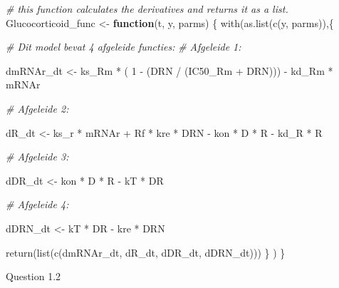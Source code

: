 \documentclass[
]{article}
\newenvironment{Shaded}{\begin{snugshade}}{\end{snugshade}}
\newcommand{\CommentTok}[1]{\textcolor[rgb]{0.56,0.35,0.01}{\textit{#1}}}
\newcommand{\ControlFlowTok}[1]{\textcolor[rgb]{0.13,0.29,0.53}{\textbf{#1}}}
\newcommand{\DecValTok}[1]{\textcolor[rgb]{0.00,0.00,0.81}{#1}}
\newcommand{\FunctionTok}[1]{\textcolor[rgb]{0.00,0.00,0.00}{#1}}
\newcommand{\NormalTok}[1]{#1}
\newcommand{\OtherTok}[1]{\textcolor[rgb]{0.56,0.35,0.01}{#1}}
\newcommand{\SpecialCharTok}[1]{\textcolor[rgb]{0.00,0.00,0.00}{#1}}
\begin{document}
\begin{Shaded}
\begin{Highlighting}[]
\CommentTok{\# this function calculates the derivatives and returns it as a list.}
\NormalTok{Glucocorticoid\_func }\OtherTok{\textless{}{-}} \ControlFlowTok{function}\NormalTok{(t, y, parms) \{}
    \FunctionTok{with}\NormalTok{(}\FunctionTok{as.list}\NormalTok{(}\FunctionTok{c}\NormalTok{(y, parms)),\{}
      
      \CommentTok{\# Dit model bevat 4 afgeleide functies:}
      \CommentTok{\# Afgeleide 1:}
  
\NormalTok{      dmRNAr\_dt }\OtherTok{\textless{}{-}}\NormalTok{ ks\_Rm }\SpecialCharTok{*}\NormalTok{ ( }\DecValTok{1} \SpecialCharTok{{-}}\NormalTok{ (DRN }\SpecialCharTok{/}\NormalTok{ (IC50\_Rm }\SpecialCharTok{+}\NormalTok{ DRN))) }\SpecialCharTok{{-}}\NormalTok{ kd\_Rm }\SpecialCharTok{*}\NormalTok{ mRNAr}
  
      \CommentTok{\# Afgeleide 2:}
  
\NormalTok{      dR\_dt }\OtherTok{\textless{}{-}}\NormalTok{ ks\_r }\SpecialCharTok{*}\NormalTok{ mRNAr }\SpecialCharTok{+}\NormalTok{ Rf }\SpecialCharTok{*}\NormalTok{ kre }\SpecialCharTok{*}\NormalTok{ DRN }\SpecialCharTok{{-}}\NormalTok{ kon }\SpecialCharTok{*}\NormalTok{ D }\SpecialCharTok{*}\NormalTok{ R }\SpecialCharTok{{-}}\NormalTok{ kd\_R }\SpecialCharTok{*}\NormalTok{ R}
      
      \CommentTok{\# Afgeleide 3:}
  
\NormalTok{      dDR\_dt }\OtherTok{\textless{}{-}}\NormalTok{ kon }\SpecialCharTok{*}\NormalTok{ D }\SpecialCharTok{*}\NormalTok{ R }\SpecialCharTok{{-}}\NormalTok{ kT }\SpecialCharTok{*}\NormalTok{ DR}
  
      \CommentTok{\# Afgeleide 4:}
  
\NormalTok{      dDRN\_dt }\OtherTok{\textless{}{-}}\NormalTok{ kT }\SpecialCharTok{*}\NormalTok{ DR }\SpecialCharTok{{-}}\NormalTok{ kre }\SpecialCharTok{*}\NormalTok{ DRN}
      
      \FunctionTok{return}\NormalTok{(}\FunctionTok{list}\NormalTok{(}\FunctionTok{c}\NormalTok{(dmRNAr\_dt, dR\_dt, dDR\_dt, dDRN\_dt)))}
\NormalTok{       \}}
\NormalTok{       )}
\NormalTok{\}}
\end{Highlighting}
\end{Shaded}

Question 1.2
\end{document}

